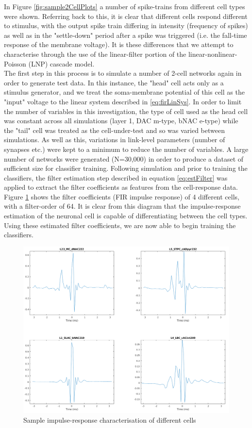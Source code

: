 In Figure \ref{fig:sample2CellPlots} a number of spike-trains from different cell types were shown. Referring back to this, it is clear that different cells respond different to stimulus, with the output spike train differing in intensity (frequency of spikes) as well as in the "settle-down" period after a spike was triggered (i.e. the fall-time response of the membrane voltage). It is these differences that we attempt to characterise through the use of the linear-filter portion of the linear-nonlinear-Poisson (LNP) cascade model.\\
The first step in this process is to simulate a number of 2-cell networks again in order to generate test data. In this instance, the "head" cell acts only as a stimulus generator, and we treat the soma-membrane potential of this cell as the "input" voltage to the linear system described in \ref{eq:firLinSys}. In order to limit the number of variables in this investigation, the type of cell used as the head cell was constant across all simulations (layer 1, DAC m-type, bNAC e-type) while the "tail" cell was treated as the cell-under-test and so was varied between simulations. As well as this, variations in link-level parameters (number of synapses etc.) were kept to a minimum to reduce the number of variables. A large number of networks were generated (N=30,000) in order to produce a dataset of sufficient size for classifier training.
Following simulation and prior to training the classifiers, the filter estimation step described in equation \ref{eq:estFilter} was applied to extract the filter coefficients as features from the cell-response data. Figure \ref{fig:sampImpRes} shows the filter coefficients (FIR impulse response) of 4 different cells, with a filter-order of 64. It is clear from this diagram that the impulse-response estimation of the neuronal cell is capable of differentiating between the cell types. Using these estimated filter coefficients, we are now able to begin training the classifiers.
\begin{figure}[ht]
    \centering
    \includegraphics[width=\textwidth]{05-Results/sampImpRes.png}
    \caption{Sample impulse-response characterisation of different cells}
    \label{fig:sampImpRes}
\end{figure}

